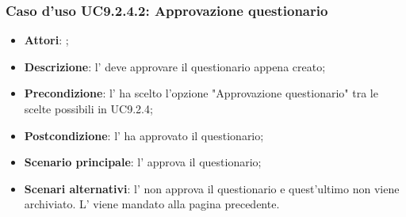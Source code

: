 			\subsubsection{Caso d'uso UC9.2.4.2: Approvazione questionario}
			\label{UC9.2.4.2}
			\begin{itemize}
				\item \textbf{Attori}: \uaupro{};
				\item \textbf{Descrizione}: l'\uaupro{} deve approvare il questionario appena creato;
				\item \textbf{Precondizione}: l'\uaupro{} ha scelto l'opzione "Approvazione questionario" tra le scelte possibili in UC9.2.4; 
				\item \textbf{Postcondizione}: l'\uaupro{} ha approvato il questionario;
				\item \textbf{Scenario principale}: l'\uaupro{} approva il questionario;
				\item \textbf{Scenari alternativi}: l'\uaupro{} non approva il questionario e quest'ultimo non viene archiviato. L'\uaupro{} viene mandato alla pagina precedente.
			\end{itemize}				
	 
